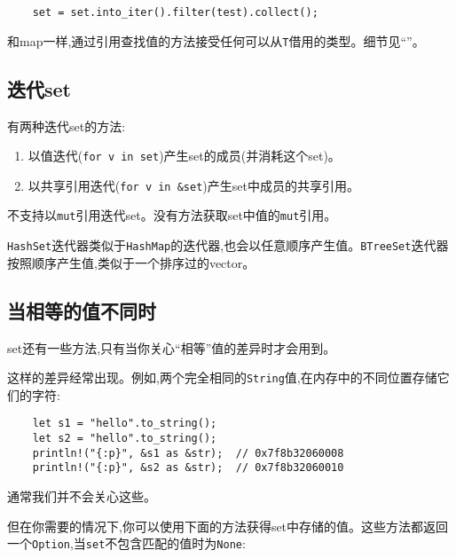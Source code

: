 \begin{verbatim}
    set = set.into_iter().filter(test).collect();
\end{verbatim}

和map一样,通过引用查找值的方法接受任何可以从\texttt{T}借用的类型。细节见“”。

\subsection{迭代set}
有两种迭代set的方法:
\begin{enumerate}
    \item 以值迭代(\texttt{for v in set})产生set的成员(并消耗这个set)。
    \item 以共享引用迭代(\texttt{for v in \&set})产生set中成员的共享引用。
\end{enumerate}

不支持以\texttt{mut}引用迭代set。没有方法获取set中值的\texttt{mut}引用。


\texttt{HashSet}迭代器类似于\texttt{HashMap}的迭代器,也会以任意顺序产生值。\texttt{BTreeSet}迭代器按照顺序产生值,类似于一个排序过的vector。

\subsection{当相等的值不同时}
set还有一些方法,只有当你关心“相等”值的差异时才会用到。

这样的差异经常出现。例如,两个完全相同的\texttt{String}值,在内存中的不同位置存储它们的字符:

\begin{verbatim}
    let s1 = "hello".to_string();
    let s2 = "hello".to_string();
    println!("{:p}", &s1 as &str);  // 0x7f8b32060008
    println!("{:p}", &s2 as &str);  // 0x7f8b32060010
\end{verbatim}

通常我们并不会关心这些。

但在你需要的情况下,你可以使用下面的方法获得set中存储的值。这些方法都返回一个\texttt{Option},当\texttt{set}不包含匹配的值时为\texttt{None}:



